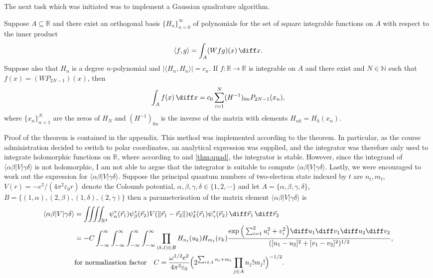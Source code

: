 \documentclass[11pt,english,a4paper]{article}
\begin{document}
The next task which was initiated was to implement a Gaussian quadrature algorithm. \begin{theorem}
Suppose $A \subseteq \mathbb{R}$ and there exist an orthogonal basis $\{H_n\}_{n=0}^\infty$ of polynomials for the set of square integrable functions on $A$ with respect to the inner product
\[
\langle f,g\rangle = \int_A (Wfg)(x)\, \diff x.
\]
Suppose also that $H_n$ is a degree $n$-polynomial and $|\langle H_n,H_n \rangle| = c_n$. If $f: \mathbb{R} \to \mathbb{R}$ is integrable on $A$ and there exist and $N \in \mathbb{N}$ such that $f(x) = (WP_{2N-1})(x)$, then 
\[
\int_A f(x)\, \diff x = c_0 \sum_{i=1}^N (H^{-1})_{0n} P_{2N-1}(x_n),
\]
where $\{x_n\}_{n=1}^N$ are the zeros of $H_N$ and $(H^{-1})_{0n}$ is the inverse of the matrix with elements $H_{nk} = H_k(x_n)$.
\end{theorem} Proof of the theorem is contained in the appendix. This method was implemented according to the theorem. In particular, as the course administration decided to switch to polar coordinates, an analytical expression was supplied, and the integrator was therefore only used to integrate holomorphic functions on $\mathbb{R}$, where according to \cite[9,18]{stein_complex_2003} and \ref{thm:quad}, the integrator is stable. However, since the integrand of $\langle \alpha \beta | V | \gamma\delta \rangle$ is not holomorphic, I am not able to argue that the integrator is suitable to compute $\langle \alpha \beta | V | \gamma\delta \rangle$. Lastly, we were encouraged to work out the expression for $\langle \alpha \beta | V | \gamma\delta \rangle$. Suppose the principal quantum numbers of two-electron state indexed by $t$ are $n_t,m_t$, $V(r) = -e^2/(4\pi^2\varepsilon_0 r)$ denote the Coloumb potential, $\alpha,\beta,\gamma,\delta \in \{1,2,\cdots\}$ and let $A=\{ \alpha,\beta,\gamma,\delta  \}$, $B = \{(1,\alpha),(2,\beta),(1,\delta),(2,\gamma)\}$ then a parameterisation of the matrix element $\langle \alpha \beta | V  |  \gamma \delta \rangle$ is
\begin{align*}
\langle \alpha \beta | V  |  \gamma \delta \rangle &= \iiiint_{\mathbb{R}^4} \psi^*_\alpha(\vec{r}_1)\psi^*_\beta(\vec{r}_2)V(\| \vec{r}_1-\vec{r}_2 \|)\psi^*_\delta(\vec{r}_1)\psi^*_\gamma(\vec{r}_2)\,\diff \vec{r}_1 \, \diff \vec{r}_2\\
&= - C \int_{-\infty}^\infty\int_{-\infty}^\infty\int_{-\infty}^\infty\int_{-\infty}^\infty \prod_{(k,t)\in B} H_{n_t}(u_k) H_{m_t}(v_k)\frac{\exp\Big(\sum_{i=1}^2 u_i^2 + v_i^2 \Big)\diff u_1 \diff v_1 \diff u_2 \diff v_2}{([u_1 - u_2]^2 + [v_1 - v_2]^2)^{1/2}}, \\
&\text{for normalization factor} \quad C = \frac{\omega^{1/2} e^2}{4 \pi^3 \varepsilon_0}\Big( 2^{\sum_{i \in A} n_i + m_i}\prod_{j \in A}n_j!m_j! \Big)^{  -1/2}.
\end{align*}
\end{document}
